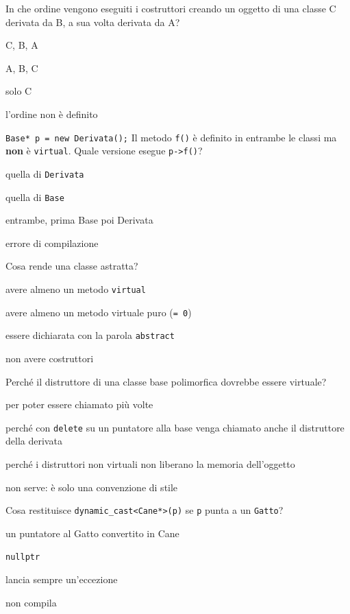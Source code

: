 \begin{quiz}{In che ordine vengono eseguiti i costruttori creando un oggetto di una classe C derivata da B, a sua volta derivata da A?}
  \item C, B, A
  \item A, B, C
  \item solo C
  \item l'ordine non è definito
\end{quiz}

\begin{quiz}{\texttt{Base* p = new Derivata();} Il metodo \texttt{f()} è definito in entrambe le classi ma \textbf{non} è \texttt{virtual}. Quale versione esegue \texttt{p->f()}?}
  \item quella di \texttt{Derivata}
  \item quella di \texttt{Base}
  \item entrambe, prima Base poi Derivata
  \item errore di compilazione
\end{quiz}

\begin{quiz}{Cosa rende una classe astratta?}
  \item avere almeno un metodo \texttt{virtual}
  \item avere almeno un metodo virtuale puro (\texttt{= 0})
  \item essere dichiarata con la parola \texttt{abstract}
  \item non avere costruttori
\end{quiz}

\begin{quiz}{Perché il distruttore di una classe base polimorfica dovrebbe essere virtuale?}
  \item per poter essere chiamato più volte
  \item perché con \texttt{delete} su un puntatore alla base venga chiamato anche il distruttore della derivata
  \item perché i distruttori non virtuali non liberano la memoria dell'oggetto
  \item non serve: è solo una convenzione di stile
\end{quiz}

\begin{quiz}{Cosa restituisce \texttt{dynamic\_cast<Cane*>(p)} se \texttt{p} punta a un \texttt{Gatto}?}
  \item un puntatore al Gatto convertito in Cane
  \item \texttt{nullptr}
  \item lancia sempre un'eccezione
  \item non compila
\end{quiz}

